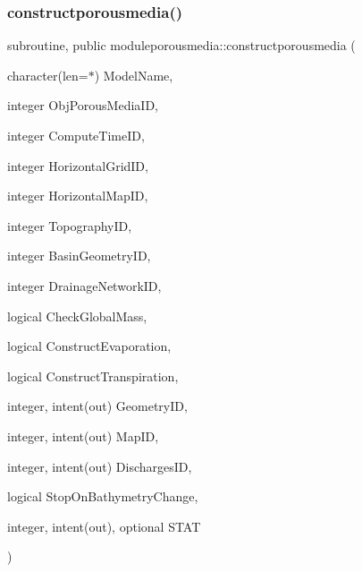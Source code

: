 \subsubsection{\texorpdfstring{constructporousmedia()}{constructporousmedia()}}
{\footnotesize\ttfamily subroutine, public moduleporousmedia\+::constructporousmedia (\begin{DoxyParamCaption}\item[{character(len=$\ast$)}]{Model\+Name,  }\item[{integer}]{Obj\+Porous\+Media\+ID,  }\item[{integer}]{Compute\+Time\+ID,  }\item[{integer}]{Horizontal\+Grid\+ID,  }\item[{integer}]{Horizontal\+Map\+ID,  }\item[{integer}]{Topography\+ID,  }\item[{integer}]{Basin\+Geometry\+ID,  }\item[{integer}]{Drainage\+Network\+ID,  }\item[{logical}]{Check\+Global\+Mass,  }\item[{logical}]{Construct\+Evaporation,  }\item[{logical}]{Construct\+Transpiration,  }\item[{integer, intent(out)}]{Geometry\+ID,  }\item[{integer, intent(out)}]{Map\+ID,  }\item[{integer, intent(out)}]{Discharges\+ID,  }\item[{logical}]{Stop\+On\+Bathymetry\+Change,  }\item[{integer, intent(out), optional}]{S\+T\+AT }\end{DoxyParamCaption})}


